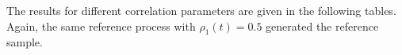 \documentclass[12pt, a4paper]{article}
\theoremstyle{MAstyle} \newtheorem{assumption}{Assumption}[section]
\theoremstyle{MAstyle} \newtheorem{definition}{Definition}[section]
\theoremstyle{MAstyle} \newtheorem{theorem}{Theorem}[section]
\begin{document}
		The results for different correlation parameters are given in the following tables. Again, the same reference process with $\rho_1(t) = 0.5$ generated the reference sample.
%	                                          	
%
\end{document}
